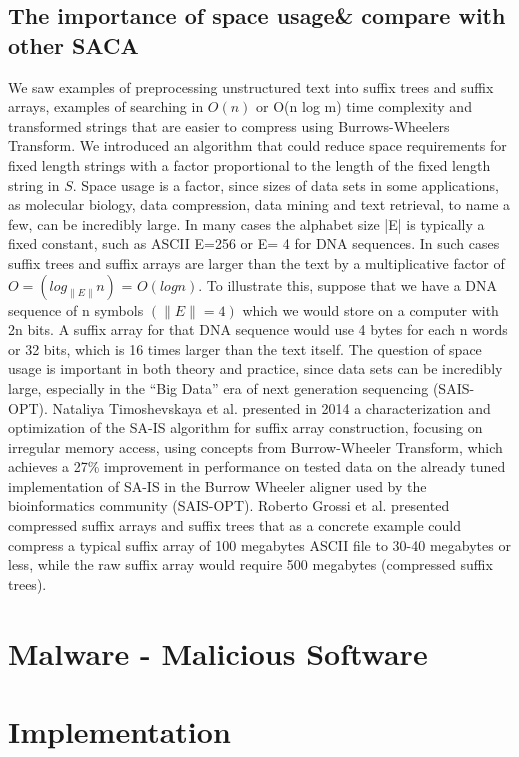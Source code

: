 \documentclass[12pt]{article} %
\begin{document}
\subsection{The importance of space usage\& compare with other SACA}

We saw examples of preprocessing unstructured text into suffix trees and suffix arrays, examples of searching in $O(n)$ or O(n log m) time complexity and transformed strings that are easier to compress using Burrows-Wheelers Transform. We introduced an algorithm that could reduce space requirements for fixed length strings with a factor proportional to the length of the fixed length string in $S$. Space usage is a factor, since sizes of data sets in some applications, as molecular biology, data compression, data mining and text retrieval, to name a few, can be incredibly large. In many cases the alphabet size |E| is typically a fixed constant, such as ASCII E=256 or E= 4 for DNA sequences. In such cases suffix trees and suffix arrays are larger than the text by a multiplicative factor of $O=(log_{\|E\|}n)$ = $O(log n)$. To illustrate this, suppose that we have a DNA sequence of n symbols $(\|E\|=4)$ which we would store on a computer with 2n bits. A suffix array for that DNA sequence would use 4 bytes for each n words or 32 bits, which is 16 times larger than the text itself. 
The question of space usage is important in both theory and practice, since data sets can be incredibly large, especially in the “Big Data” era of next generation sequencing (SAIS-OPT). Nataliya Timoshevskaya et al. presented in 2014 a characterization and optimization of the SA-IS algorithm for suffix array construction, focusing on irregular memory access, using concepts from Burrow-Wheeler Transform, which achieves a 27\% improvement in performance on tested data on the already tuned implementation of SA-IS in the Burrow Wheeler aligner used by the bioinformatics community (SAIS-OPT). Roberto Grossi et al. presented compressed suffix arrays and suffix trees that as a concrete example could compress a typical suffix array of 100 megabytes ASCII file to 30-40 megabytes or less, while the raw suffix array would require 500 megabytes (compressed suffix trees). 



\section{Malware - Malicious Software}

\section{Implementation}
\end{document}
